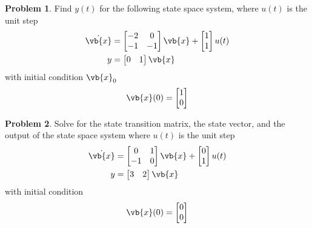 \documentclass[10pt]{article}
\theoremstyle{definition}
\newtheorem{prob}{Problem}[section]
\begin{document}
\begin{prob}
    Find \(y(t) \) for the following state space system, where \( u(t) \) is the unit step
    \begin{align*}
        \dot{\vb{x}} &= \begin{bmatrix}-2 & 0 \\ -1 & -1\end{bmatrix} \vb{x} + \begin{bmatrix}1 \\ 1\end{bmatrix} u(t) \\
        y &= \begin{bmatrix}0 & 1 \end{bmatrix}  \vb{x} 
    \end{align*}
    with initial condition \( \vb{x}_0 \)
    \begin{align*}
        \vb{x}(0) = \begin{bmatrix}1 \\ 0\end{bmatrix}
    \end{align*}
\end{prob}

\begin{prob}
    Solve for the state transition matrix, the state vector, and the output of the state space system where \( u(t) \) is the unit step
    \begin{align*}
        \dot{\vb{x}} &= \begin{bmatrix} 0 & 1 \\ -1 & 0 \end{bmatrix} \vb{x} + \begin{bmatrix} 0 \\ 1 \end{bmatrix} u(t)  \\
        y &= \begin{bmatrix} 3 &  2 \end{bmatrix} \vb{x} 
    \end{align*}
    with initial condition
    \begin{align*}
        \vb{x}(0) = \begin{bmatrix} 0 \\ 0 \end{bmatrix}
    \end{align*}
\end{prob}
\end{document}
